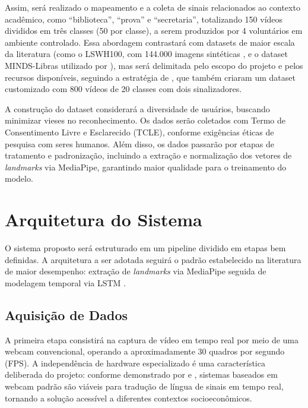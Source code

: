 Assim, será realizado o mapeamento e a coleta de sinais relacionados ao contexto acadêmico, como ``biblioteca'', ``prova'' e ``secretaria'', totalizando 150 vídeos divididos em três classes (50 por classe), a serem produzidos por 4 voluntários em ambiente controlado. Essa abordagem contrastará com datasets de maior escala da literatura (como o LSWH100, com 144.000 imagens sintéticas \cite{lobo-neto:24}, e o dataset MINDS-Libras utilizado por ), mas será delimitada pelo escopo do projeto e pelos recursos disponíveis, seguindo a estratégia de , que também criaram um dataset customizado com 800 vídeos de 20 classes com dois sinalizadores.

A construção do dataset considerará a diversidade de usuários, buscando minimizar vieses no reconhecimento. Os dados serão coletados com Termo de Consentimento Livre e Esclarecido (TCLE), conforme exigências éticas de pesquisa com seres humanos. Além disso, os dados passarão por etapas de tratamento e padronização, incluindo a extração e normalização dos vetores de \textit{landmarks} via MediaPipe, garantindo maior qualidade para o treinamento do modelo.

\section{Arquitetura do Sistema}
\label{sec:arquitetura}

O sistema proposto será estruturado em um pipeline dividido em etapas bem definidas. A arquitetura a ser adotada seguirá o padrão estabelecido na literatura de maior desempenho: extração de \textit{landmarks} via MediaPipe seguida de modelagem temporal via LSTM \cite{kamble:25,varshini:25,anithadevi:25,navendu:24,maia:25}.

\subsection{Aquisição de Dados}

A primeira etapa consistirá na captura de vídeo em tempo real por meio de uma webcam convencional, operando a aproximadamente 30 quadros por segundo (FPS). A independência de hardware especializado é uma característica deliberada do projeto: conforme demonstrado por  e , sistemas baseados em webcam padrão são viáveis para tradução de língua de sinais em tempo real, tornando a solução acessível a diferentes contextos socioeconômicos.

